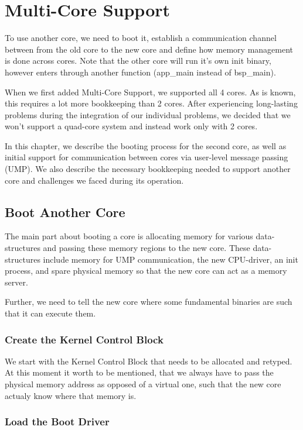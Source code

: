 \chapter{Multi-Core Support}

To use another core, we need to boot it, establish a communication channel
between from the old core to the new core and define how memory management is
done across cores. Note that the other core will run it's own init binary,
however enters through another function (app\_main instead of bsp\_main).

When we first added Multi-Core Support, we supported all 4 cores. As is known,
this requires a lot more bookkeeping than 2 cores. After experiencing long-lasting
problems during the integration of our individual problems, we decided that we
won't support a quad-core system and instead work only with 2 cores.


In this chapter, we describe the booting process for the second core,
as well as initial support for communication between cores via user-level message
passing (UMP). We also describe the necessary bookkeeping needed to support another core
and challenges we faced during its operation.

\section{Boot Another Core}

The main part about booting a core is allocating memory for various
data-structures and passing these memory regions to the new core. 
These data-structures include memory for UMP communication,
the new CPU-driver, an init process, and spare physical memory so that the new core
can act as a memory server.

Further, we need to tell the new core where some fundamental binaries are such that it can
execute them.

\subsection{Create the Kernel Control Block}

We start with the Kernel Control Block that needs to be allocated and retyped.
At this moment it worth to be mentioned, that we always have to pass the
physical memory address as opposed of a virtual one, such that the new core
actualy know where that memory is. 

\subsection{Load the Boot Driver}

